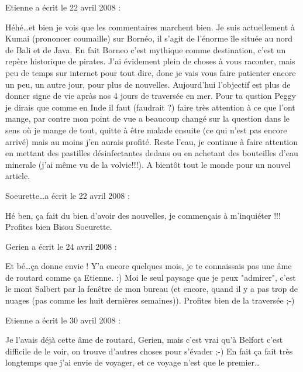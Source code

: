 \medskip
Etienne a écrit le 22 avril 2008 :
\begin{displayquote}
Héhé\dots et bien je vois que les commentaires marchent bien.
Je suis actuellement à Kumai (prononcer coumaille) sur Bornéo, il s'agit de l'énorme île située au nord de Bali et de Java.
En fait Borneo c'est mythique comme destination, c'est un repère historique de pirates.
J'ai évidement plein de choses à vous raconter, mais peu de temps sur internet pour tout dire, donc je vais vous faire patienter encore un peu, un autre jour, pour plus de nouvelles. Aujourd'hui l'objectif est plus de donner signe de vie apràs nos 4 jours de traversée en mer.
Pour ta qustion Peggy je dirais que comme en Inde il faut (faudrait ?) faire très attention à ce que l'ont mange, par contre mon point de vue a beaucoup changé sur la question dans le sens où je mange de tout, quitte à être malade ensuite (ce qui n'est pas encore arrivé) mais au moins j'en aurais profité. Reste l'eau, je continue à faire attention en mettant des pastilles désinfectantes dedans ou en achetant des bouteilles d'eau minerale (j'ai même vu de la volvic!!!).
A bientôt tout le monde pour un nouvel article.
\end{displayquote}

\medskip
Soeurette\dots a écrit le 22 avril 2008 :
\begin{displayquote}
Hé ben, ça fait du bien d'avoir des nouvelles, je commençais à m'inquiéter !!!
Profites bien
Bisou
Soeurette.
\end{displayquote}

\medskip
Gerien a écrit le 24 avril 2008 :
\begin{displayquote}
Et bé\dots ça donne envie !
Y'a encore quelques mois, je te connaissais pas une âme de routard comme ça Etienne. :)
Moi le seul paysage que je peux "admirer", c'est le mont Salbert par la fenêtre de mon bureau (et encore, quand il y a pas trop de nuages (pas comme les huit dernières semaines)).
Profites bien de la traversée ;-)
\end{displayquote}

\medskip
Etienne a écrit le 30 avril 2008 :
\begin{displayquote}
Je l'avais déjà cette âme de routard, Gerien, mais c'est vrai qu'à Belfort c'est difficile de le voir, on trouve d'autres choses pour s'évader ;-) En fait ça fait très longtemps que j'ai envie de voyager, et ce voyage n'est que le premier\dots
\end{displayquote}

\vfill
